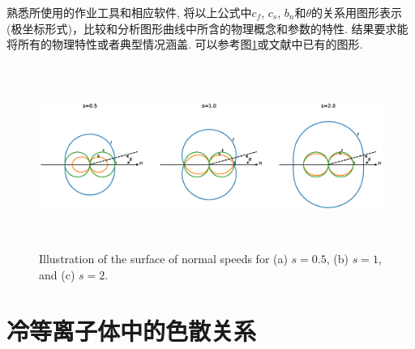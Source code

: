 \documentclass{article}
\begin{document}
	熟悉所使用的作业工具和相应软件, 将以上公式中$c_f$, $c_s$,
	$b_n$和$\theta$的关系用图形表示(极坐标形式)，比较和分析图形曲线中所含的物理概念和参数的特性.
	结果要求能将所有的物理特性或者典型情况涵盖. 可以参考图\ref{Friedrich}或文献\citet{Jeffrey1964}中已有的图形.
	\begin{figure}[htb]
		\centering
		\includegraphics[height=6cm,width=15cm]{figure1.eps}
		\caption{Illustration of the surface of normal speeds for (a) $s = 0.5$, (b) $s=1$, and (c) $s=2$.}\label{Friedrich}
	\end{figure}
	
	\section{冷等离子体中的色散关系}
	
\end{document}
